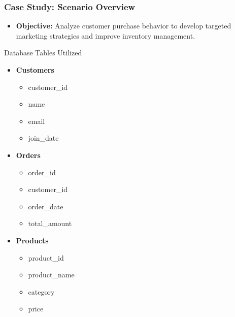 \documentclass[aspectratio=169]{beamer}
\begin{document}
\begin{frame}[fragile]
    \frametitle{Case Study: Scenario Overview}
    \begin{itemize}
        \item \textbf{Objective:} Analyze customer purchase behavior to develop targeted marketing strategies and improve inventory management.
    \end{itemize}

    \begin{block}{Database Tables Utilized}
        \begin{itemize}
            \item \textbf{Customers}
                \begin{itemize}
                    \item customer\_id
                    \item name
                    \item email
                    \item join\_date
                \end{itemize}
            \item \textbf{Orders}
                \begin{itemize}
                    \item order\_id
                    \item customer\_id
                    \item order\_date
                    \item total\_amount
                \end{itemize}
            \item \textbf{Products}
                \begin{itemize}
                    \item product\_id
                    \item product\_name
                    \item category
                    \item price
                \end{itemize}
        \end{itemize}
    \end{block}
\end{frame}
\end{document}
